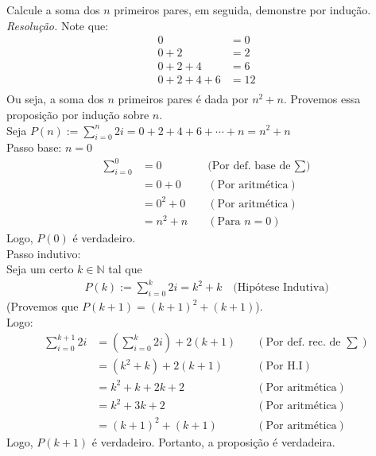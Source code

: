 Calcule a soma dos $n$ primeiros pares, em seguida, demonstre por indução. \\
\emph{Resolução.}
Note que:
\begin{align*}
	0             & = 0  \\
	0 + 2         & = 2  \\
	0 + 2 + 4     & = 6  \\
	0 + 2 + 4 + 6 & = 12 \\
\end{align*}
Ou seja, a soma dos $n$ primeiros pares é dada por $n^2 + n$. Provemos essa proposição por indução sobre $n$. \\
Seja $P(n):= \sum\limits_{i = 0}^{n}2i = 0 + 2 + 4 + 6 + \cdots + n = n^2 + n$ \\
Passo base: $n = 0$
\begin{align*}
	\sum\limits_{i = 0}^{0} & = 0       & \quad \text{(Por def. base de $\sum$)} \\
	                        & = 0 + 0   & \quad(\text{Por aritmética})           \\
	                        & = 0^2 + 0 & \quad(\text{Por aritmética})           \\
	                        & = n^2 + n & \quad(\text{Para $n = 0$})
\end{align*}
Logo, $P(0)$ é verdadeiro. \\
Passo indutivo: \\
Seja um certo $k \in \mathbb{N}$ tal que
\begin{align*}
	P(k):= \sum\limits_{i = 0}^{k}2i = k^2 + k \quad \text{(Hipótese Indutiva)}
\end{align*}
(Provemos que $P(k + 1) = (k + 1)^2 + (k + 1)$). \\
Logo:
\begin{align*}
	\sum\limits_{i=0}^{k + 1}2i & = (\sum\limits_{i = 0}^{k}2i) + 2(k + 1) & \quad(\text{Por def. rec. de $\sum$}) \\
	                            & = (k^2 + k) + 2(k + 1)                   & \quad(\text{Por H.I})                 \\
	                            & = k^2 + k + 2k + 2                       & \quad(\text{Por aritmética})          \\
	                            & = k^2 + 3k + 2                           & \quad(\text{Por aritmética})          \\
	                            & = (k + 1)^2 + (k + 1)                    & \quad(\text{Por aritmética})
\end{align*}
Logo, $P(k + 1)$ é verdadeiro.
Portanto, a proposição é verdadeira.
